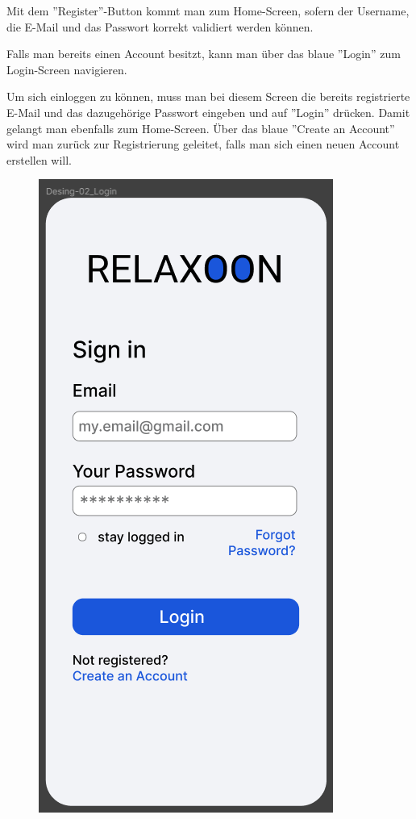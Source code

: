 Mit dem ''Register''-Button kommt man zum Home-Screen, sofern der Username, die E-Mail und das Passwort korrekt validiert
werden können.

Falls man bereits einen Account besitzt, kann man über das blaue ''Login'' zum Login-Screen navigieren.

\newpage

Um sich einloggen zu können, muss man bei diesem Screen die bereits registrierte E-Mail und das dazugehörige Passwort 
eingeben und auf ''Login'' drücken. Damit gelangt man ebenfalls zum Home-Screen. Über das blaue ''Create an Account''
wird man zurück zur Registrierung geleitet, falls man sich einen neuen Account erstellen will.

\begin{figure}[H]
    \begin{minipage}{0.5\textwidth}
        \centering
        \includegraphics[height=2\textwidth]{./pics/pLogin.png}

\end{minipage}
\end{figure}
